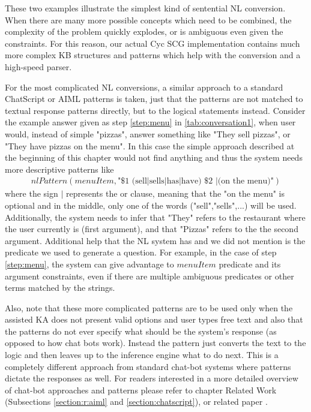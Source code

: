These two examples illustrate the simplest kind of sentential NL conversion. 
When there are many more possible concepts which need to be combined, the 
complexity of the problem quickly explodes, or is ambiguous even given the 
constraints. For this reason, our actual Cyc SCG implementation contains much 
more complex KB structures and patterns which help with the conversion and a 
high-speed parser.

For the most complicated NL conversions, a similar approach to a standard 
ChatScript or AIML patterns \parencite{Wilcox2011,Wallace2013} is taken, just 
that the patterns are not matched to textual response patterns directly, but 
to the logical statements instead. Consider the example answer given as step 
\ref{step:menu} in \autoref{tab:conversation1}, when user would, instead of 
simple "pizzas", answer something like "They sell pizzas", or "They have 
pizzas on the menu". In this case the simple approach described at the 
beginning of this chapter would not find anything and thus the system needs 
more descriptive patterns like
\begin{equation}\label{nl:complexPattern}
\begin{gathered}
nlPattern(menuItem,\text{"\$1 (sell|sells|has|have) \$2 |(on the menu)"})
\end{gathered}
\end{equation}
where the sign $|$ represents the or clause, meaning that the "on the menu" is
optional and in the middle, only one of the words ("sell","sells",...) will
be used. Additionally, the system needs to infer that "They" refers to the
restaurant where the user currently is (first argument), and that "Pizzas" refers to the the second argument.
Additional help that the NL system has and we did not mention is the predicate
we used to generate a question. For example, in the case of step 
\ref{step:menu}, the system can give advantage to $menuItem$ predicate and its
argument constraints, even if there are multiple ambiguous predicates or other
terms matched by the strings.

Also, note that these more complicated patterns are to be used only when the 
assisted KA does not present valid options and user types free text and also that the patterns do not ever specify what should be the system's response (as opposed to how chat bots work). Instead the pattern just converts the text to the logic and then leaves up to the inference engine what to do next. This is a completely different approach from standard chat-bot systems where patterns dictate the responses as well. For readers interested in a more detailed overview of chat-bot approaches and patterns please refer to chapter Related Work (Subsections \ref{section:r:aiml} and \ref{section:chatscript}), or related paper
\parencite{Bradesko2012}.

